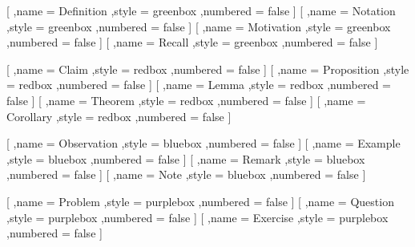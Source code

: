         [
            ,name = Definition
            ,style = greenbox
            ,numbered = false
        ]
        [
            ,name = Notation
            ,style = greenbox
            ,numbered = false
        ]
        [
            ,name = Motivation
            ,style = greenbox
            ,numbered = false
        ]
        [
            ,name = Recall
            ,style = greenbox
            ,numbered = false
        ]

        [
            ,name = Claim
            ,style = redbox
            ,numbered = false
        ]
        [
            ,name = Proposition
            ,style = redbox
            ,numbered = false
        ]
        [
            ,name = Lemma
            ,style = redbox
            ,numbered = false
        ]
        [
            ,name = Theorem
            ,style = redbox
            ,numbered = false
        ]
        [
            ,name = Corollary
            ,style = redbox
            ,numbered = false
        ]

        [
            ,name = Observation
            ,style = bluebox
            ,numbered = false
        ]
        [
            ,name = Example
            ,style = bluebox
            ,numbered = false
        ]
        [
            ,name = Remark
            ,style = bluebox
            ,numbered = false
        ]
        [
            ,name = Note
            ,style = bluebox
            ,numbered = false
        ]

        [
            ,name = Problem
            ,style = purplebox
            ,numbered = false
        ]
        [
            ,name = Question
            ,style = purplebox
            ,numbered = false
        ]
        [
            ,name = Exercise
            ,style = purplebox
            ,numbered = false
        ]

